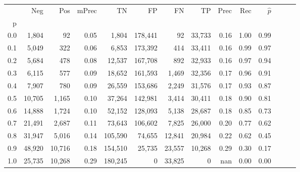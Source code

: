 \begin{tabular}{rrrrrrrrrrrrrr}
\toprule
{} &     Neg &     Pos & mPrec &       TN &       FP &      FN &      TP &  Prec &   Rec & $\hat{p}$ \\
p   &         &         &       &          &          &         &         &       &       &           \\
\midrule
0.0 &   1,804 &      92 &  0.05 &    1,804 &  178,441 &      92 &  33,733 &  0.16 &  1.00 &      0.99 \\
0.1 &   5,049 &     322 &  0.06 &    6,853 &  173,392 &     414 &  33,411 &  0.16 &  0.99 &      0.97 \\
0.2 &   5,684 &     478 &  0.08 &   12,537 &  167,708 &     892 &  32,933 &  0.16 &  0.97 &      0.94 \\
0.3 &   6,115 &     577 &  0.09 &   18,652 &  161,593 &   1,469 &  32,356 &  0.17 &  0.96 &      0.91 \\
0.4 &   7,907 &     780 &  0.09 &   26,559 &  153,686 &   2,249 &  31,576 &  0.17 &  0.93 &      0.87 \\
0.5 &  10,705 &   1,165 &  0.10 &   37,264 &  142,981 &   3,414 &  30,411 &  0.18 &  0.90 &      0.81 \\
0.6 &  14,888 &   1,724 &  0.10 &   52,152 &  128,093 &   5,138 &  28,687 &  0.18 &  0.85 &      0.73 \\
0.7 &  21,491 &   2,687 &  0.11 &   73,643 &  106,602 &   7,825 &  26,000 &  0.20 &  0.77 &      0.62 \\
0.8 &  31,947 &   5,016 &  0.14 &  105,590 &   74,655 &  12,841 &  20,984 &  0.22 &  0.62 &      0.45 \\
0.9 &  48,920 &  10,716 &  0.18 &  154,510 &   25,735 &  23,557 &  10,268 &  0.29 &  0.30 &      0.17 \\
1.0 &  25,735 &  10,268 &  0.29 &  180,245 &        0 &  33,825 &       0 &   nan &  0.00 &      0.00 \\
\bottomrule
\end{tabular}
